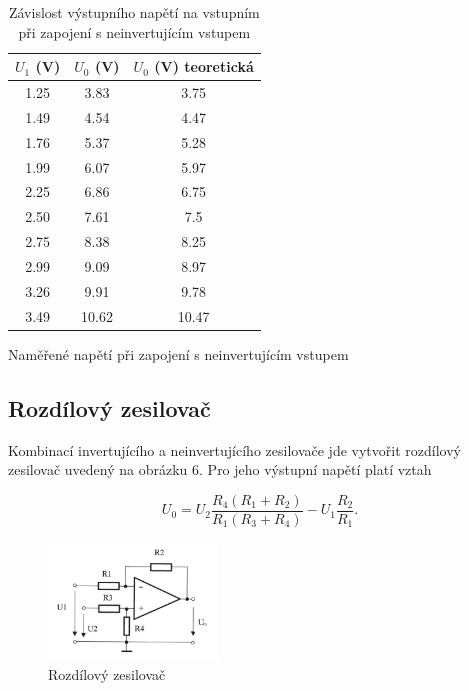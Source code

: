 \documentclass[a4paper,11pt]{article}
\begin{document}
\begin{table}[h]
    \begin{minipage}{.45\linewidth}
    \vspace{-15pt}
    \centering
    \begin{tabular}{| c c c | }
        \hline
        $ U_1 $ (V) & $ U_0 $ (V) & $ U_0 $ (V)  teoretická \\ \hline
       1.25 & 3.83  &  3.75  \\
       1.49 & 4.54  &  4.47  \\
       1.76 & 5.37  &  5.28  \\
       1.99 & 6.07  &  5.97  \\
       2.25 & 6.86  &  6.75  \\
       2.50 & 7.61  &  7.5   \\
       2.75 & 8.38  &  8.25  \\
       2.99 & 9.09  &  8.97  \\
       3.26 & 9.91  &  9.78  \\
       3.49 & 10.62 &  10.47 \\
        \hline
    \end{tabular}
    \caption{Naměřené napětí při zapojení s neinvertujícím vstupem}
    \end{minipage} 
    \hfill
    \begin{minipage}{.5\linewidth}
        \centering
        \resizebox{\textwidth}{!}{  }
        \captionsetup{type=graph}
        \caption{Závislost výstupního napětí na vstupním při zapojení s neinvertujícím vstupem}
    \end{minipage} 
\end{table}

\newpage

\subsection{Rozdílový zesilovač}

Kombinací invertujícího a neinvertujícího zesilovače jde vytvořit rozdílový zesilovač uvedený na obrázku 6. Pro jeho výstupní napětí platí vztah

\begin{equation}
    U_0 = U_2 \frac{R_4 (R_1 + R_2)}{R_1 (R_3 + R_4)} - U_1 \frac{R_2}{R_1}.
\end{equation}

\begin{figure}[h]
    \centering
    \includegraphics[width=0.4\textwidth]{rozdilovy_sch.jpg}
    \caption{Rozdílový zesilovač}
\end{figure}
\end{document}
